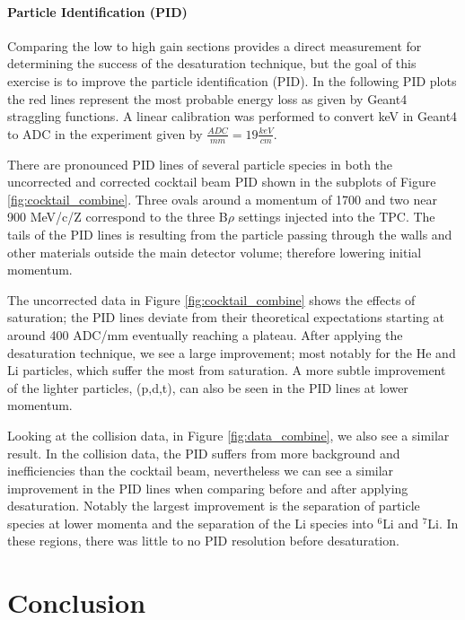 \documentclass[review]{elsarticle}
\begin{document}
\paragraph{Particle Identification (PID)}


Comparing the low to high gain sections provides a direct measurement for determining the success of the desaturation technique, but the goal  of this exercise is to improve the particle identification (PID). In the following PID plots the red lines represent the most probable energy loss as given by Geant4 straggling functions. A linear calibration was performed to convert keV in Geant4 to ADC in the experiment given by $\frac{ADC}{mm} = 19 \frac{keV}{cm}$.

There are pronounced PID lines of several particle species in both the uncorrected and corrected cocktail beam PID shown in the subplots of Figure \ref{fig:cocktail_combine}. Three ovals around a momentum of 1700 and two near 900 MeV/c/Z correspond to the three B$\rho$ settings injected into the TPC. The tails of the PID lines is resulting from the particle passing through the walls and other materials outside the main detector volume; therefore lowering initial momentum. 

The uncorrected data in Figure \ref{fig:cocktail_combine} shows the effects of saturation; the PID lines deviate from their theoretical expectations starting at around 400 ADC/mm eventually reaching a plateau. After applying the desaturation technique, we see a large improvement; most notably for the He and Li particles, which suffer the most from saturation. A more subtle improvement of the lighter particles, (p,d,t), can also be seen in the PID lines at lower momentum.

Looking at the collision data, in Figure \ref{fig:data_combine}, we also see a similar result. In the collision data, the PID suffers from more background and inefficiencies than the cocktail beam, nevertheless we can see a similar improvement in the PID lines when comparing before and after applying desaturation. Notably the largest improvement is the separation of particle species at lower momenta and the separation of the Li species into ${}^{6}$Li and ${}^{7}$Li. In these regions, there was little to no PID resolution before desaturation. 

\clearpage

\section{Conclusion}
\end{document}
